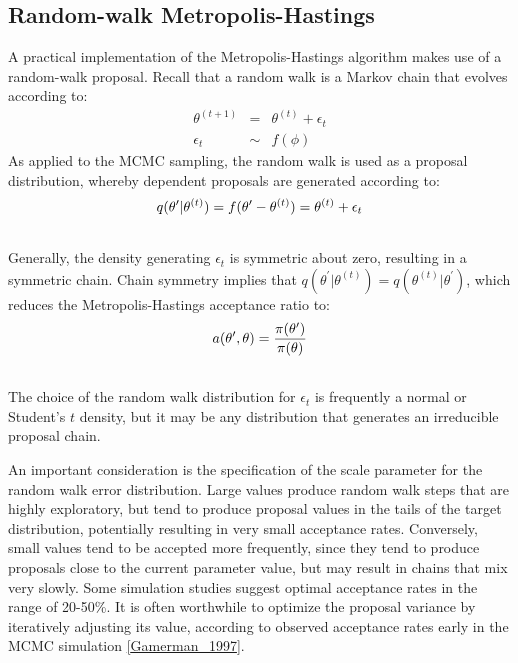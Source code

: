 \documentclass[letterpaper,10pt,english]{sphinxmanual}
\begin{document}
\subsection{Random-walk Metropolis-Hastings}
\label{theory:random-walk-metropolis-hastings}
A practical implementation of the Metropolis-Hastings algorithm makes use of a
random-walk proposal. Recall that a random walk is a Markov chain that evolves
according to:
\begin{eqnarray*}
\theta^{(t+1)} &=& \theta^{(t)} + \epsilon_t \\
\epsilon_t &\sim& f(\phi)
\end{eqnarray*}
As applied to the MCMC sampling, the random walk is used as a proposal
distribution, whereby dependent proposals are generated according to:
\begin{gather}
\begin{split}q(\theta^{\prime} | \theta^{(t)}) = f(\theta^{\prime} - \theta^{(t)}) = \theta^{(t)} + \epsilon_t\end{split}\notag\\\begin{split}\end{split}\notag
\end{gather}
Generally, the density generating $\epsilon_t$ is symmetric about zero,
resulting in a symmetric chain. Chain symmetry implies that
$q(\theta^{\prime} | \theta^{(t)}) = q(\theta^{(t)} | \theta^{\prime})$,
which reduces the Metropolis-Hastings acceptance ratio to:
\begin{gather}
\begin{split}a(\theta^{\prime},\theta) = \frac{\pi(\theta^{\prime})}{\pi(\theta)}\end{split}\notag\\\begin{split}\end{split}\notag
\end{gather}
The choice of the random walk distribution for $\epsilon_t$ is frequently
a normal or Student's $t$ density, but it may be any distribution that
generates an irreducible proposal chain.

An important consideration is the specification of the scale parameter for the
random walk error distribution. Large values produce random walk steps that are
highly exploratory, but tend to produce proposal values in the tails of the
target distribution, potentially resulting in very small acceptance rates.
Conversely, small values tend to be accepted more frequently, since they tend to
produce proposals close to the current parameter value, but may result in chains
that mix very slowly. Some simulation studies suggest optimal acceptance rates
in the range of 20-50\%. It is often worthwhile to optimize the proposal variance
by iteratively adjusting its value, according to observed acceptance rates early
in the MCMC simulation {\hyperref[references:gamerman-1997]{{[}Gamerman\_1997{]}}}.
\end{document}
